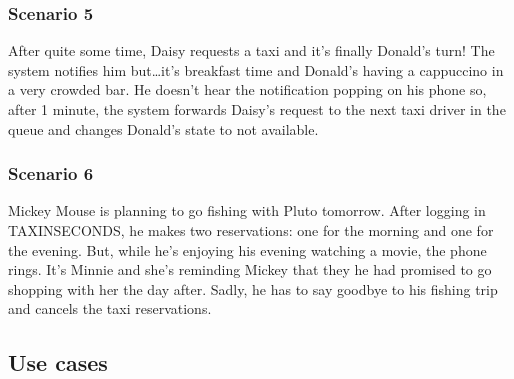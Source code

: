 \documentclass{article}
\begin{document}
\subsubsection{Scenario 5}
After quite some time, Daisy requests a taxi and it's finally Donald's turn! The system notifies him but\ldots it's breakfast time and Donald's having a cappuccino in a very crowded bar. He doesn't hear the notification popping on his phone so, after 1 minute, the system forwards Daisy's request to the next taxi driver in the queue and changes Donald's state to not available.
\subsubsection{Scenario 6}
Mickey Mouse is planning to go fishing with Pluto tomorrow. After logging in TAXINSECONDS, he makes two reservations: one for the morning and one for the evening. But, while he's enjoying his evening watching a movie, the phone rings. It's Minnie and she's reminding Mickey that they he had promised to go shopping with her the day after. Sadly, he has to say goodbye to his fishing trip and cancels the taxi reservations.

\subsection{Use cases}
\end{document}
